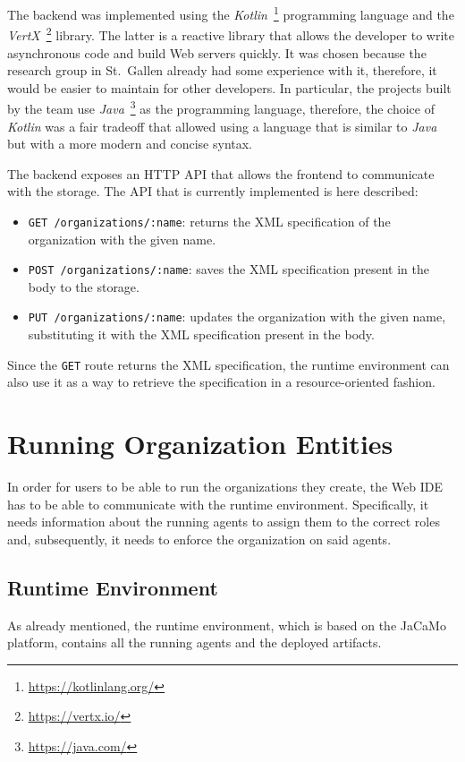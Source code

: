 The backend was implemented using the \textit{Kotlin}~\footnote{\url{https://kotlinlang.org/}} programming language and the \textit{VertX}~\footnote{\url{https://vertx.io/}} library.
The latter is a reactive library that allows the developer to write asynchronous code and build Web servers quickly.
It was chosen because the research group in St.\ Gallen already had some experience with it, therefore, it would be easier to maintain for other developers.
In particular, the projects built by the team use \textit{Java}~\footnote{\url{https://java.com/}} as the programming language, therefore, the choice of \textit{Kotlin} was a fair tradeoff that allowed using a language that is similar to \textit{Java} but with a more modern and concise syntax.

The backend exposes an HTTP API that allows the frontend to communicate with the storage.
The API that is currently implemented is here described:
\begin{itemize}
    \item \texttt{GET /organizations/:name}: returns the XML specification of the organization with the given name.
    \item \texttt{POST /organizations/:name}: saves the XML specification present in the body to the storage.
    \item \texttt{PUT /organizations/:name}: updates the organization with the given name, substituting it with the XML specification present in the body.
\end{itemize}
Since the \texttt{GET} route returns the XML specification, the runtime environment can also use it as a way to retrieve the specification in a resource-oriented fashion.

\section{Running Organization Entities}
In order for users to be able to run the organizations they create, the Web IDE has to be able to communicate with the runtime environment.
Specifically, it needs information about the running agents to assign them to the correct roles and, subsequently, it needs to enforce the organization on said agents.

\subsection{Runtime Environment}
As already mentioned, the runtime environment, which is based on the JaCaMo platform, contains all the running agents and the deployed artifacts.

